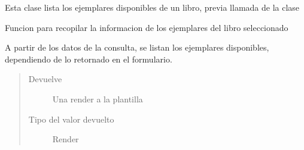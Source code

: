 \documentclass[letterpaper,10pt,spanish]{sphinxmanual}
\begin{document}

\begin{fulllineitems}
\label{\detokenize{modules/libro/views:libro.views.EjemplaresVista}}
Esta clase lista los ejemplares disponibles de un libro, previa llamada de la clase 

\begin{fulllineitems}
\label{\detokenize{modules/libro/views:libro.views.EjemplaresVista.get}}
Funcion para recopilar la informacion de los ejemplares del libro seleccionado

A partir de los datos de la consulta, se listan los ejemplares disponibles, dependiendo de lo retornado en el formulario.
\begin{quote}\begin{description}
\item[{Devuelve}] \leavevmode
Una render a la plantilla 

\item[{Tipo del valor devuelto}] \leavevmode
Render

\end{description}\end{quote}

\end{fulllineitems}


\end{fulllineitems}

\end{document}
